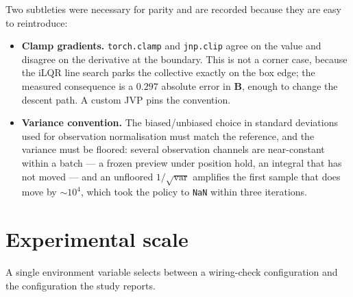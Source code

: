 \documentclass[11pt,a4paper,twoside,openright]{report}
\newcommand{\mat}[1]{\bm{#1}}
\theoremstyle{plain}
\theoremstyle{definition}
\theoremstyle{remark}
\begin{document}
	Two subtleties were necessary for parity and are recorded because they are easy
	to reintroduce:

	\begin{itemize}[leftmargin=*]
		\item \textbf{Clamp gradients.} \texttt{torch.clamp} and \texttt{jnp.clip} agree
		on the value and disagree on the derivative at the boundary. This is not a
		corner case, because the iLQR line search parks the collective exactly on the
		box edge; the measured consequence is a $0.297$ absolute error in $\mat B$,
		enough to change the descent path. A custom JVP pins the convention.
		\item \textbf{Variance convention.} The biased/unbiased choice in standard
		deviations used for observation normalisation must match the reference, and the
		variance must be floored: several observation channels are near-constant within
		a batch --- a frozen preview under position hold, an integral that has not
		moved --- and an unfloored $1/\sqrt{\mathrm{var}}$ amplifies the first sample
		that does move by $\sim10^4$, which took the policy to \texttt{NaN} within
		three iterations.
	\end{itemize}

	\section{Experimental scale}

	A single environment variable selects between a wiring-check configuration and
	the configuration the study reports.
\end{document}
